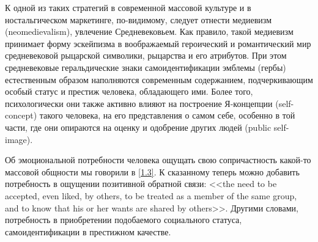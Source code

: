 К одной из таких стратегий в современной массовой культуре и  в ностальгическом маркетинге,
по-видимому, следует отнести  медиевизм (neomedievalism), увлечение
Средневековьем.\autocite{eco1986dreaming}\autocite{eco1986living}\autocite{lindstrom2011brandwashed}
Как правило, такой медиевизм принимает форму эскейпизма в воображаемый
героический и романтический мир средневековой рыцарской символики, рыцарства и
его атрибутов. При этом средневековые геральдические знаки самоидентификации эмблемы
(гербы) естественным образом наполняются современным содержанием,
подчеркивающим особый статус и престиж человека, обладающего
ими.\autocite{elistratov2004}\autocite{bergelson2002}
Более того, психологически они также активно влияют на построение Я-концепции
(self-concept) такого человека, на его представления о самом себе, особенно
в той части, где они опираются на оценку и одобрение других людей (public self-image).\autocite{mesheryakov2004}

Об эмоциональной потребности человека ощущать свою сопричастность какой-то массовой
общности мы говорили в \ref{1.3}. К сказанному теперь можно добавить потребность в ощущении позитивной
обратной связи: <<the need to be accepted, even liked, by others, to be treated as
a member of the same group, and to know that his or her wants are shared by
others>>.\autocite{yule1996pragmatics} Другими словами, потребность в приобретении
подобаемого социального статуса, самоидентификации в престижном качестве.


